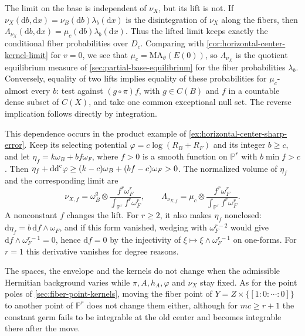 \enlargethispage{2\baselineskip}
The limit on the base is independent of $\nu_X$, but its lift is not. If
$\nu_X(\mathrm{d}b,\mathrm{d}x)=\nu_B(\mathrm{d}b)\lambda_b(\mathrm{d}x)$ is the disintegration of $\nu_X$ along the fibers, then
$\Lambda_{\nu_X}(\mathrm{d}b,\mathrm{d}x)=\mu_c(\mathrm{d}b)\lambda_b(\mathrm{d}x)$.
Thus the lifted limit keeps exactly the conditional fiber probabilities over $D_c$. Comparing with \cref{cor:horizontal-center-kernel-limit} for $v=0$, we see that $\mu_c=\mathrm{MA}_\theta(E(0))$, so $\Lambda_{\nu_X}$ is the quotient equilibrium measure of \cref{sec:partial-base-equilibrium} for the fiber probabilities $\lambda_b$.
Conversely, equality of two lifts implies equality of these probabilities for $\mu_c$-almost every $b$: test against $(g\circ\pi)f$, with $g\in C(B)$ and $f$ in a countable dense subset of $C(X)$, and take one common exceptional null set. The reverse implication follows directly by integration.

This dependence occurs in the product example of \cref{ex:horizontal-center-sharp-error}. Keep its selecting potential $\varphi=c\log(R_B+R_F)$ and its integer $b\geq c$, and let
$\eta_f=k\omega_B+bf\omega_F$, where $f>0$ is a smooth function on $\mathbb P^r$ with $b\min f>c$. Then
$\eta_f+\mathrm{dd}^{\mathrm{c}}\varphi\geq(k-c)\omega_B+(bf-c)\omega_F>0$. The normalized volume of $\eta_f$ and the corresponding limit are
\[
 \nu_{X,f}=\omega_B^q\otimes\frac{f^r\omega_F^r}{\int_{\mathbb P^r}f^r\omega_F^r},
 \qquad
 \Lambda_{\nu_{X,f}}=\mu_c\otimes\frac{f^r\omega_F^r}{\int_{\mathbb P^r}f^r\omega_F^r}.
\]
A nonconstant $f$ changes the lift. For $r\geq2$, it also makes $\eta_f$ nonclosed: $\mathrm{d}\eta_f=b\,\mathrm{d}f\wedge\omega_F$, and if this form vanished, wedging with $\omega_F^{r-2}$ would give $\mathrm{d}f\wedge\omega_F^{r-1}=0$, hence $\mathrm{d}f=0$ by the injectivity of $\xi\mapsto\xi\wedge\omega_F^{r-1}$ on one-forms. For $r=1$ this derivative vanishes for degree reasons.

The spaces, the envelope and the kernels do not change when the admissible Hermitian background varies while $\pi,A,h_A,\varphi$ and $\nu_X$ stay fixed. As for the point poles of \cref{sec:fiber-point-kernels}, moving the fiber point of $Y=Z\times\{[1:0:\cdots:0]\}$ to another point of $\mathbb P^r$ does not change them either, although for $mc\geq r+1$ the constant germ fails to be integrable at the old center and becomes integrable there after the move.

